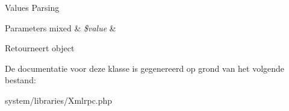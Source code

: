 Values Parsing


\begin{DoxyParams}[1]{Parameters}
mixed & {\em \$value} & \\
\hline
\end{DoxyParams}
\begin{DoxyReturn}{Retourneert}
object 
\end{DoxyReturn}


De documentatie voor deze klasse is gegenereerd op grond van het volgende bestand\+:\begin{DoxyCompactItemize}
\item 
system/libraries/Xmlrpc.\+php\end{DoxyCompactItemize}
